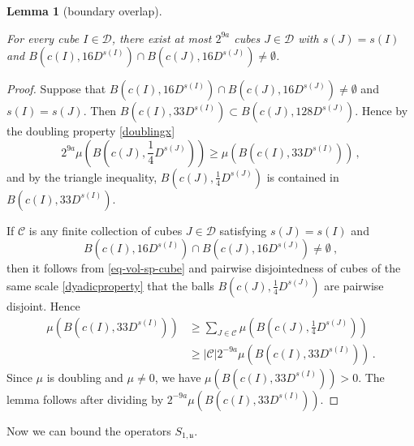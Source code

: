 \documentclass[10pt,a4paper]{article}
\theoremstyle{plain}
\newtheorem{lemma}[theorem]{Lemma}
\theoremstyle{definition}
\numberwithin{equation}{subsection}
\newcommand{\fu}{{\mathfrak u}}
\newcommand{\lean}[1]{}
\newcommand{\leanok}{}
\begin{document}
\begin{lemma}[boundary overlap]
    \label{boundary-overlap}
    \leanok
    \lean{TileStructure.Forest.boundary_overlap}
    For every cube $I \in \mathcal{D}$, there exist at most $2^{9a}$ cubes $J \in \mathcal{D}$ with $s(J) = s(I)$ and $B(c(I), 16D^{s(I)}) \cap B(c(J), 16 D^{s(J)}) \ne \emptyset$.
\end{lemma}

\begin{proof}
    \leanok
    Suppose that $B(c(I), 16 D^{s(I)}) \cap B(c(J), 16 D^{s(J)}) \ne \emptyset$ and $s(I) = s(J)$. Then $B(c(I), 33 D^{s(I)}) \subset B(c(J), 128 D^{s(J)})$. Hence by the doubling property \eqref{doublingx}
    $$
        2^{9a}\mu(B(c(J), \frac{1}{4}D^{s(J)})) \ge \mu(B(c(I), 33 D^{s(I)}))\,,
    $$
    and by the triangle inequality, $B(c(J), \frac{1}{4}D^{s(J)})$ is contained in $B(c(I), 33 D^{s(I)})$.

    If $\mathcal{C}$ is any finite collection of cubes $J \in \mathcal{D}$ satisfying $s(J) = s(I)$ and
    \begin{equation*}
        B(c(I), 16 D^{s(I)}) \cap B(c(J), 16 D^{s(J)}) \ne\emptyset\ ,
    \end{equation*} then it follows from \eqref{eq-vol-sp-cube} and pairwise disjointedness of cubes of the same scale \eqref{dyadicproperty} that the balls $B(c(J), \frac{1}{4} D^{s(J)})$ are pairwise disjoint. Hence
    \begin{align*}
        \mu(B(c(I), 33 D^{s(I)})) &\ge \sum_{J \in \mathcal{C}} \mu(B(c(J), \frac{1}{4}D^{s(J)}))\\
        &\ge |\mathcal{C}| 2^{-9a} \mu(B(c(I), 33 D^{s(I)}))\,.
    \end{align*}
    Since $\mu$ is doubling and $\mu \ne 0$, we have $\mu(B(c(I), 33D^{s(I)})) > 0$. The lemma follows after dividing by $2^{-9a}\mu(B(c(I), 33D^{s(I)}))$.
\end{proof}

Now we can bound the operators $S_{1, \fu}$.
\end{document}
